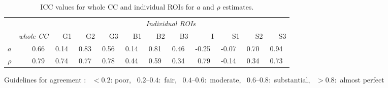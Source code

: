\begin{table}[ht]
\caption{ICC values for whole CC and individual ROIs for $a$ and $\rho$ estimates.}
\begin{adjustbox}{width={\textwidth},totalheight=\textheight,keepaspectratio}
\begin{tabular}{rrrrrrrrrrrr}
      \toprule
       & & \multicolumn{10}{c}{\textit{Individual ROIs}}                                             \\
       & \textit{whole CC} & G1    & G2    & G3    & B1    & B2    & B3    & I     & S1    & S2    & S3\\
       \cmidrule(rl){2-2} \cmidrule(l){3-12}
       \addlinespace
$a$    & 0.66~\usebox{\substantialBox} & 0.14~\usebox{\poorBox}  & 0.83~\usebox{\perfectBox} & 0.56~\usebox{\moderateBox}  & 0.14~\usebox{\poorBox}  & 0.81~\usebox{\perfectBox}  & 0.46~\usebox{\moderateBox}  & -0.25~\usebox{\poorBox} & -0.07~\usebox{\poorBox} & 0.70~\usebox{\substantialBox}  & 0.94~\usebox{\perfectBox}  \\
$\rho$ & 0.79~\usebox{\substantialBox} & 0.74~\usebox{\substantialBox}  & 0.77~\usebox{\substantialBox}  & 0.78~\usebox{\substantialBox}  & 0.44~\usebox{\moderateBox}  & 0.59~\usebox{\moderateBox}  & 0.34~\usebox{\fairBox}  & 0.79~\usebox{\substantialBox}  & -0.14~\usebox{\poorBox} & 0.34~\usebox{\fairBox}  & 0.73~\usebox{\substantialBox}  \\
\bottomrule
\end{tabular}
\end{adjustbox}
{\footnotesize Guidelines for agreement  \citep{Landis:1977}: \usebox{\poorBox}~$<0.2$: poor,  \usebox{\fairBox}~$0.2–0.4$:~fair,  \usebox{\moderateBox}~$0.4–0.6$:~moderate, \usebox{\substantialBox}~$0.6–0.8$:~substantial,  \usebox{\perfectBox}~$>0.8$:~almost perfect}
\end{table}

\bgroup
\tikzset{use png} %

